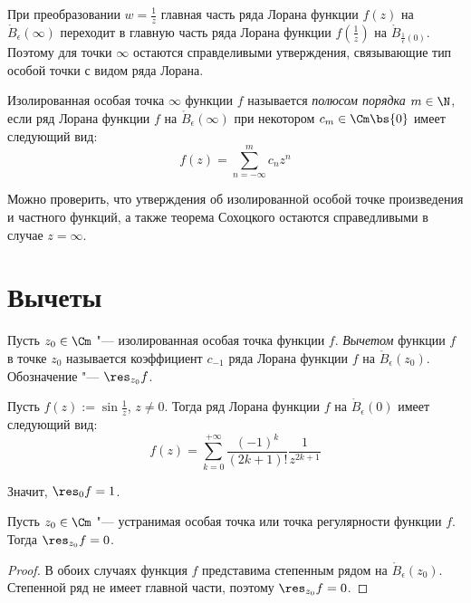 \begin{note}
	При преобразовании $w = \frac 1z$ главная часть ряда Лорана функции $f(z)$ на $\mathring B_\epsilon(\infty)$ переходит в главную часть ряда Лорана функции $f(\frac 1z)$ на $\mathring B_{\frac1\epsilon(0)}$. Поэтому для точки $\infty$ остаются справделивыми утверждения, связывающие тип особой точки с видом ряда Лорана.
\end{note}

\begin{definition}
	Изолированная особая точка $\infty$ функции $f$ называется \textit{полюсом порядка $m \in \N$}, если ряд Лорана функции $f$ на $\mathring B_\epsilon(\infty)$ при некотором $c_{m} \in \Cm \bs \{0\}$ имеет следующий вид:
	\[f(z) = \sum_{n = -\infty}^{m}c_nz^n\]
\end{definition}

\begin{note}
	Можно проверить, что утверждения об изолированной особой точке произведения и частного функций, а также теорема Сохоцкого остаются справедливыми в случае $z = \infty$.
\end{note}

\section{Вычеты}

\begin{definition}
	Пусть $z_0 \in \Cm$ "--- изолированная особая точка функции $f$. \textit{Вычетом} функции $f$ в точке $z_0$ называется коэффициент $c_{-1}$ ряда Лорана функции $f$ на $\mathring B_\epsilon(z_0)$. Обозначение "--- $\res_{z_0}f$.
\end{definition}

\begin{example}
	Пусть $f(z) := \sin{\frac 1z}$, $z \ne 0$. Тогда ряд Лорана функции $f$ на $\mathring B_\epsilon(0)$ имеет следующий вид:
	\[f(z) = \sum_{k = 0}^{+\infty}\frac{(-1)^k}{(2k+1)!}\frac1{z^{2k+1}}\]
	
	Значит, $\res_0{f} = 1$.
\end{example}

\begin{proposition}
	Пусть $z_0 \in \Cm$ "--- устранимая особая точка или точка регулярности функции $f$. Тогда $\res_{z_0}f = 0$.
\end{proposition}

\begin{proof}
	В обоих случаях функция $f$ представима степенным рядом на $\mathring B_\epsilon(z_0)$. Степенной ряд не имеет главной части, поэтому $\res_{z_0}f = 0$.
\end{proof}

